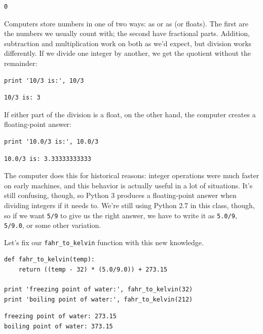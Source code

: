 \documentclass{book}
\begin{document}
\begin{verbatim}
0
\end{verbatim}

Computers store numbers in one of two ways: as
 or as  (or floats). The first are the numbers we usually count with;
the second have fractional parts. Addition, subtraction and
multiplication work on both as we'd expect, but division works
differently. If we divide one integer by another, we get the quotient
without the remainder:

\begin{verbatim}
print '10/3 is:', 10/3
\end{verbatim}

\begin{verbatim}
10/3 is: 3
\end{verbatim}

If either part of the division is a float, on the other hand, the
computer creates a floating-point answer:

\begin{verbatim}
print '10.0/3 is:', 10.0/3
\end{verbatim}

\begin{verbatim}
10.0/3 is: 3.33333333333
\end{verbatim}

The computer does this for historical reasons: integer operations were
much faster on early machines, and this behavior is actually useful in a
lot of situations. It's still confusing, though, so Python 3 produces a
floating-point answer when dividing integers if it needs to. We're still
using Python 2.7 in this class, though, so if we want \texttt{5/9} to
give us the right answer, we have to write it as \texttt{5.0/9},
\texttt{5/9.0}, or some other variation.

Let's fix our \texttt{fahr\_to\_kelvin} function with this new
knowledge.

\begin{verbatim}
def fahr_to_kelvin(temp):
    return ((temp - 32) * (5.0/9.0)) + 273.15

print 'freezing point of water:', fahr_to_kelvin(32)
print 'boiling point of water:', fahr_to_kelvin(212)
\end{verbatim}

\begin{verbatim}
freezing point of water: 273.15
boiling point of water: 373.15
\end{verbatim}
\end{document}
